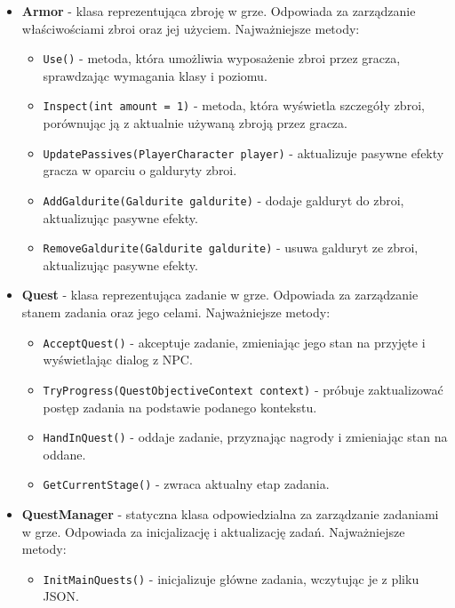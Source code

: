 \begin{itemize}
            \item \textbf{Armor} - klasa reprezentująca zbroję w grze. Odpowiada za zarządzanie właściwościami zbroi oraz jej użyciem. Najważniejsze metody:
                \begin{itemize}
                    \item \texttt{Use()} - metoda, która umożliwia wyposażenie zbroi przez gracza, sprawdzając wymagania klasy i poziomu.
                    \item \texttt{Inspect(int amount = 1)} - metoda, która wyświetla szczegóły zbroi, porównując ją z aktualnie używaną zbroją przez gracza.
                    \item \texttt{UpdatePassives(PlayerCharacter player)} - aktualizuje pasywne efekty gracza w oparciu o galduryty zbroi.
                    \item \texttt{AddGaldurite(Galdurite galdurite)} - dodaje galduryt do zbroi, aktualizując pasywne efekty.
                    \item \texttt{RemoveGaldurite(Galdurite galdurite)} - usuwa galduryt ze zbroi, aktualizując pasywne efekty.
                \end{itemize}
            \item \textbf{Quest} - klasa reprezentująca zadanie w grze. Odpowiada za zarządzanie stanem zadania oraz jego celami. Najważniejsze metody:
                \begin{itemize}
                    \item \texttt{AcceptQuest()} - akceptuje zadanie, zmieniając jego stan na przyjęte i wyświetlając dialog z NPC.
                    \item \texttt{TryProgress(QuestObjectiveContext context)} - próbuje zaktualizować postęp zadania na podstawie podanego kontekstu.
                    \item \texttt{HandInQuest()} - oddaje zadanie, przyznając nagrody i zmieniając stan na oddane.
                    \item \texttt{GetCurrentStage()} - zwraca aktualny etap zadania.
                \end{itemize}
            \item \textbf{QuestManager} - statyczna klasa odpowiedzialna za zarządzanie zadaniami w grze. Odpowiada za inicjalizację i aktualizację zadań. 
            Najważniejsze metody:
                \begin{itemize}
                    \item \texttt{InitMainQuests()} - inicjalizuje główne zadania, wczytując je z pliku JSON.

\end{itemize}
\end{itemize}
